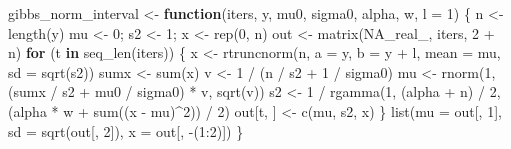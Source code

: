 \documentclass[
  letterpaper,
  DIV=11,
  numbers=noendperiod]{scrreprt}
\newenvironment{Shaded}{\begin{snugshade}}{\end{snugshade}}
\newcommand{\AttributeTok}[1]{\textcolor[rgb]{0.40,0.45,0.13}{#1}}
\newcommand{\ConstantTok}[1]{\textcolor[rgb]{0.56,0.35,0.01}{#1}}
\newcommand{\ControlFlowTok}[1]{\textcolor[rgb]{0.00,0.23,0.31}{\textbf{#1}}}
\newcommand{\DecValTok}[1]{\textcolor[rgb]{0.68,0.00,0.00}{#1}}
\newcommand{\FunctionTok}[1]{\textcolor[rgb]{0.28,0.35,0.67}{#1}}
\newcommand{\NormalTok}[1]{\textcolor[rgb]{0.00,0.23,0.31}{#1}}
\newcommand{\OtherTok}[1]{\textcolor[rgb]{0.00,0.23,0.31}{#1}}
\newcommand{\SpecialCharTok}[1]{\textcolor[rgb]{0.37,0.37,0.37}{#1}}
\begin{document}
\begin{Shaded}
\begin{Highlighting}[]
\NormalTok{gibbs\_norm\_interval }\OtherTok{\textless{}{-}} \ControlFlowTok{function}\NormalTok{(iters, y, mu0, sigma0, alpha, w, }\AttributeTok{l =} \DecValTok{1}\NormalTok{) \{}
\NormalTok{    n }\OtherTok{\textless{}{-}} \FunctionTok{length}\NormalTok{(y)}
\NormalTok{    mu }\OtherTok{\textless{}{-}} \DecValTok{0}\NormalTok{; s2 }\OtherTok{\textless{}{-}} \DecValTok{1}\NormalTok{; x }\OtherTok{\textless{}{-}} \FunctionTok{rep}\NormalTok{(}\DecValTok{0}\NormalTok{, n)}
\NormalTok{    out }\OtherTok{\textless{}{-}} \FunctionTok{matrix}\NormalTok{(}\ConstantTok{NA\_real\_}\NormalTok{, iters, }\DecValTok{2} \SpecialCharTok{+}\NormalTok{ n)}
    \ControlFlowTok{for}\NormalTok{ (t }\ControlFlowTok{in} \FunctionTok{seq\_len}\NormalTok{(iters)) \{}
\NormalTok{        x }\OtherTok{\textless{}{-}} \FunctionTok{rtruncnorm}\NormalTok{(n, }\AttributeTok{a =}\NormalTok{ y, }\AttributeTok{b =}\NormalTok{ y }\SpecialCharTok{+}\NormalTok{ l, }\AttributeTok{mean =}\NormalTok{ mu, }\AttributeTok{sd =} \FunctionTok{sqrt}\NormalTok{(s2))}
\NormalTok{        sumx }\OtherTok{\textless{}{-}} \FunctionTok{sum}\NormalTok{(x)}
\NormalTok{        v  }\OtherTok{\textless{}{-}} \DecValTok{1} \SpecialCharTok{/}\NormalTok{ (n }\SpecialCharTok{/}\NormalTok{ s2 }\SpecialCharTok{+} \DecValTok{1} \SpecialCharTok{/}\NormalTok{ sigma0)}
\NormalTok{        mu }\OtherTok{\textless{}{-}} \FunctionTok{rnorm}\NormalTok{(}\DecValTok{1}\NormalTok{, (sumx }\SpecialCharTok{/}\NormalTok{ s2 }\SpecialCharTok{+}\NormalTok{ mu0 }\SpecialCharTok{/}\NormalTok{ sigma0) }\SpecialCharTok{*}\NormalTok{ v, }\FunctionTok{sqrt}\NormalTok{(v))}
\NormalTok{        s2 }\OtherTok{\textless{}{-}} \DecValTok{1} \SpecialCharTok{/} \FunctionTok{rgamma}\NormalTok{(}\DecValTok{1}\NormalTok{, (alpha }\SpecialCharTok{+}\NormalTok{ n) }\SpecialCharTok{/} \DecValTok{2}\NormalTok{, (alpha }\SpecialCharTok{*}\NormalTok{ w }\SpecialCharTok{+} \FunctionTok{sum}\NormalTok{((x }\SpecialCharTok{{-}}\NormalTok{ mu)}\SpecialCharTok{\^{}}\DecValTok{2}\NormalTok{)) }\SpecialCharTok{/} \DecValTok{2}\NormalTok{)}
\NormalTok{        out[t, ] }\OtherTok{\textless{}{-}} \FunctionTok{c}\NormalTok{(mu, s2, x)}
\NormalTok{    \}}
    \FunctionTok{list}\NormalTok{(}\AttributeTok{mu =}\NormalTok{ out[, }\DecValTok{1}\NormalTok{], }\AttributeTok{sd =} \FunctionTok{sqrt}\NormalTok{(out[, }\DecValTok{2}\NormalTok{]), }\AttributeTok{x =}\NormalTok{ out[, }\SpecialCharTok{{-}}\NormalTok{(}\DecValTok{1}\SpecialCharTok{:}\DecValTok{2}\NormalTok{)])}
\NormalTok{\}}
\end{Highlighting}
\end{Shaded}
\end{document}
